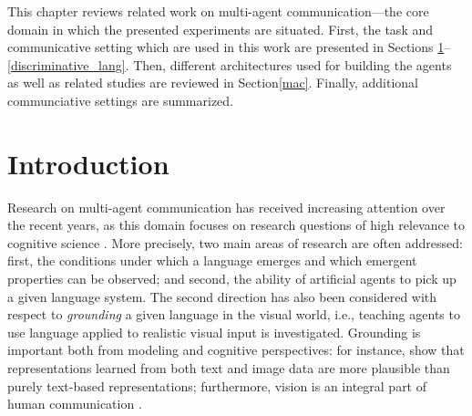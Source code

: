
This chapter reviews related work on multi-agent communication---the core domain in which the presented experiments are situated. First, the task and communicative setting which are used in this work are presented in Sections \ref{related_work_intro}--\ref{discriminative_lang}. Then, different architectures used for building the agents as well as related studies are reviewed in Section\ref{mac}. Finally, additional communciative settings are summarized.


\section{Introduction}
\label{related_work_intro}
Research on multi-agent communication has received increasing attention over the recent years, as this domain focuses on research questions of high relevance to cognitive science \parencite{lazaridou2020emergent}. More precisely, two main areas of research are often addressed: first, the conditions under which a language emerges and which emergent properties can be observed; and second, the ability of artificial agents to pick up a given language system. %
The second direction has also been considered with respect to \textit{grounding} a given language in the visual world, i.e., teaching agents to use language applied to realistic visual input is investigated. Grounding is important both from modeling and cognitive perspectives: for instance, \cite{bruni2014multimodal} show that representations learned from both text and image data are more plausible than purely text-based representations; furthermore, vision is an integral part of human communication \parencite{tomasello2010origins, harnad1990symbol, clark1991grounding}. 

